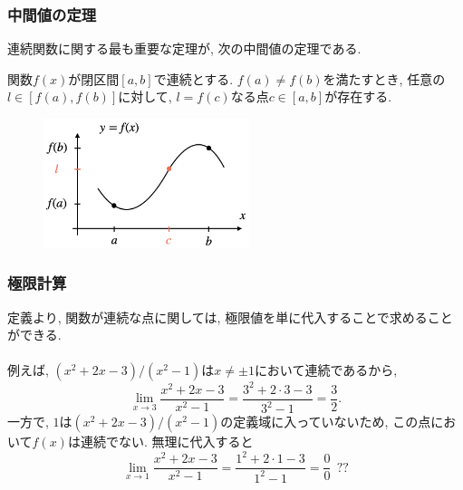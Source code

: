 

\begin{frame}
\frametitle{中間値の定理} 

連続関数に関する最も重要な定理が, 次の中間値の定理である. 

\begin{Thm}[中間値の定理]
関数$f(x)$が閉区間$[a,b]$で連続とする. 
$f(a) \neq  f(b)$を満たすとき, 任意の$l \in [f(a), f(b)]$に対して, $l=f(c)$なる点$c \in [a,b]$が存在する. 
\end{Thm}

 \begin{figure}[htbp]
 \begin{center} 
  \includegraphics[width=60mm]{calculus3/mean_value.png}
 \end{center}
\end{figure}


\end{frame}



\begin{frame}
\frametitle{極限計算} 



定義より, 関数が連続な点に関しては, 極限値を単に代入することで求めることができる. \\
\ \\

例えば, $(x^2+2x-3)/(x^2-1)$は$x\neq \pm1$において連続であるから, 
$$
\lim_{x \to 3} \frac{x^2+2x-3}{x^2-1}=\frac{3^2+2\cdot 3-3}{3^2-1}=\frac{3}{2}. 
$$
一方で, $1$は$(x^2+2x-3)/(x^2-1)$の定義域に入っていないため, この点において$f(x)$は連続でない. 
無理に代入すると
$$
\lim_{x \to 1} \frac{x^2+2x-3}{x^2-1}=\frac{1^2+2\cdot 1-3}{1^2-1}=\frac{0}{0} \ \ ?? 
$$
\end{frame}



